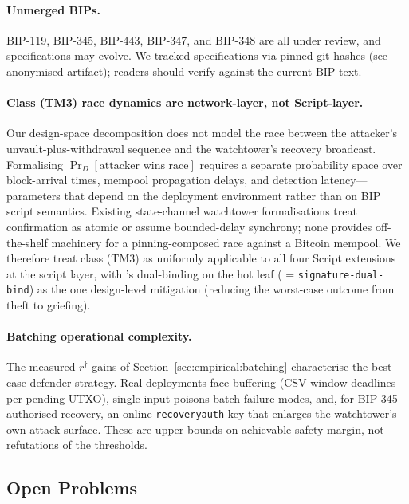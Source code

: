 \paragraph{Unmerged BIPs.}
BIP-119, BIP-345, BIP-443, BIP-347, and BIP-348 are all under
review, and specifications may evolve. We tracked specifications via
pinned git hashes (see anonymised artifact); readers should verify
against the current BIP text.

\paragraph{Class \classhot{} (TM3) race dynamics are network-layer,
not Script-layer.}
Our design-space decomposition does not model the race between the
attacker's unvault-plus-withdrawal sequence and the watchtower's
recovery broadcast. Formalising $\Pr_D[\text{attacker wins race}]$
requires a separate probability space over block-arrival times,
mempool propagation delays, and detection latency---parameters that
depend on the deployment environment rather than on BIP script
semantics. Existing state-channel watchtower formalisations treat
confirmation as atomic or assume bounded-delay synchrony; none
provides off-the-shelf machinery for a pinning-composed race against
a Bitcoin mempool. We therefore treat class \classhot{} (TM3) as
uniformly applicable to all four Script extensions at the script
layer, with \catcsfs{}'s dual-binding on the hot leaf
(\axwdbind{} = \texttt{signature-dual-bind}) as the one design-level
mitigation (reducing the worst-case outcome from theft to griefing).

\paragraph{Batching operational complexity.}
The measured $r^\dagger$ gains of
Section~\ref{sec:empirical:batching} characterise the best-case
defender strategy. Real deployments face buffering (CSV-window
deadlines per pending UTXO), single-input-poisons-batch failure
modes, and, for BIP-345 authorised recovery, an online
\texttt{recoveryauth} key that enlarges the watchtower's own attack
surface. These are upper bounds on achievable safety margin, not
refutations of the thresholds.

\subsection{Open Problems}
\label{sec:disc:open}

